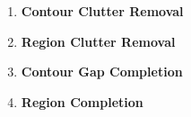 \begin{enumerate}


\item {\bf Contour Clutter Removal} %

\item {\bf Region Clutter Removal} %

\item {\bf Contour Gap Completion} %

\item {\bf Region Completion} %


\end{enumerate}





